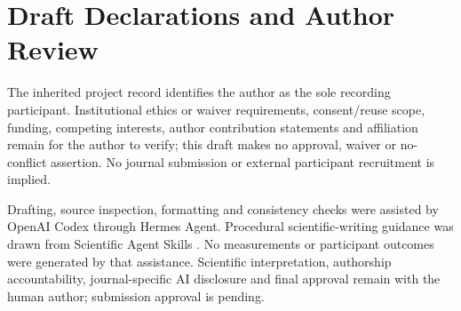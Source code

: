 \section{Draft Declarations and Author Review}\label{draft-declarations-and-author-review}

The inherited project record identifies the author as the sole recording participant. Institutional ethics or waiver requirements, consent/reuse scope, funding, competing interests, author contribution statements and affiliation remain for the author to verify; this draft makes no approval, waiver or no-conflict assertion. No journal submission or external participant recruitment is implied.

Drafting, source inspection, formatting and consistency checks were assisted by OpenAI Codex through Hermes Agent. Procedural scientific-writing guidance was drawn from Scientific Agent Skills \cite{skills}. No measurements or participant outcomes were generated by that assistance. Scientific interpretation, authorship accountability, journal-specific AI disclosure and final approval remain with the human author; submission approval is pending.
